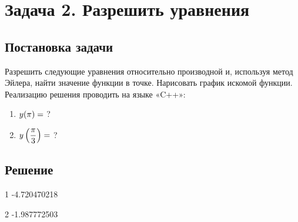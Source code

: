 

\section{Задача 2. Разрешить уравнения}
\subsection{Постановка задачи}
Разрешить следующие уравнения относительно производной и, используя метод Эйлера, найти значение функции в точке.
Нарисовать график искомой функции.
Реализацию решения проводить на языке «C++»:

\begin{enumerate}
    \item
        \customCases{\equationFirst}{\conditionFirst}


        $ y(\pi) = $ ?

    \item
        \customCases{\equationSecond}{\conditionSecond}


        $ y\left(\dfrac{\pi}{3}\right) = $ ?
\end{enumerate}

\newpage

\subsection{Решение}
\begin{enumerate}
	\solutionItemSecond
		{1}
		{\equationFirst}
		{\conditionFirst}
		{\toFindFirst}
		{-4.720470218}
	
	\clearpage
	
	\solutionItemSecond
		{2}
		{\equationSecond}
		{\conditionSecond}
		{\toFindSecond}
		{-1.987772503}

\end{enumerate}
